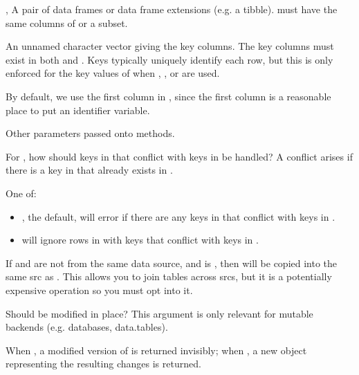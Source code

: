 \documentclass[a4paper]{book}
\begin{document}
%
\begin{Arguments}
\begin{ldescription}
\item[\code{x}, \code{y}] A pair of data frames or data frame extensions (e.g. a tibble).
 must have the same columns of  or a subset.

\item[\code{by}] An unnamed character vector giving the key columns. The key columns
must exist in both  and . Keys typically uniquely identify each row,
but this is only enforced for the key values of  when ,
, or  are used.

By default, we use the first column in , since the first column is
a reasonable place to put an identifier variable.

\item[\code{...}] Other parameters passed onto methods.

\item[\code{conflict}] For , how should keys in  that conflict
with keys in  be handled? A conflict arises if there is a key in 
that already exists in .

One of:
\begin{itemize}

\item{} , the default, will error if there are any keys in  that
conflict with keys in .
\item{}  will ignore rows in  with keys that conflict with keys in
.

\end{itemize}


\item[\code{copy}] If  and  are not from the same data source,
and  is , then  will be copied into the
same src as .  This allows you to join tables across srcs, but
it is a potentially expensive operation so you must opt into it.

\item[\code{in\_place}] Should  be modified in place? This argument is only
relevant for mutable backends (e.g. databases, data.tables).

When , a modified version of  is returned invisibly;
when , a new object representing the resulting changes is returned.


\end{ldescription}
\end{Arguments}
\end{document}
